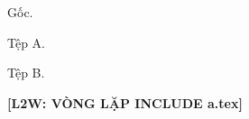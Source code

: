 \documentclass[12pt]{article}
\begin{document}
Gốc.

Tệp A.

Tệp B.
\par\textbf{[L2W: VÒNG LẶP INCLUDE a.tex]}\par
\end{document}
